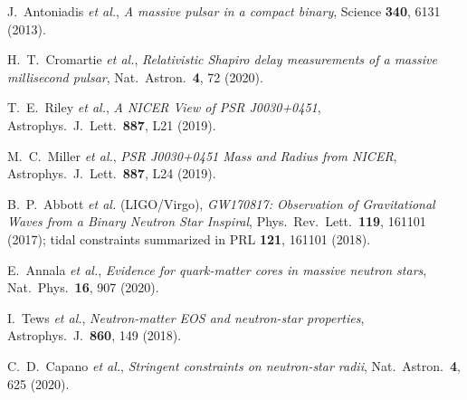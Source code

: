 \documentclass[11pt]{article}
\begin{document}
\begin{thebibliography}{99}
J.~Antoniadis \emph{et al.}, \emph{A massive pulsar in a compact binary}, Science \textbf{340}, 6131 (2013).

H.~T.~Cromartie \emph{et al.}, \emph{Relativistic Shapiro delay measurements of a massive millisecond pulsar}, Nat.\ Astron.\ \textbf{4}, 72 (2020).

T.~E.~Riley \emph{et al.}, \emph{A NICER View of PSR J0030+0451}, Astrophys.\ J.\ Lett.\ \textbf{887}, L21 (2019).

M.~C.~Miller \emph{et al.}, \emph{PSR J0030+0451 Mass and Radius from NICER}, Astrophys.\ J.\ Lett.\ \textbf{887}, L24 (2019).

B.~P.~Abbott \emph{et al.} (LIGO/Virgo), \emph{GW170817: Observation of Gravitational Waves from a Binary Neutron Star Inspiral}, Phys.\ Rev.\ Lett.\ \textbf{119}, 161101 (2017); tidal constraints summarized in PRL \textbf{121}, 161101 (2018).

E.~Annala \emph{et al.}, \emph{Evidence for quark-matter cores in massive neutron stars}, Nat.\ Phys.\ \textbf{16}, 907 (2020).

I.~Tews \emph{et al.}, \emph{Neutron-matter EOS and neutron-star properties}, Astrophys.\ J.\ \textbf{860}, 149 (2018).

C.~D.~Capano \emph{et al.}, \emph{Stringent constraints on neutron-star radii}, Nat.\ Astron.\ \textbf{4}, 625 (2020).

\end{thebibliography}
\end{document}
